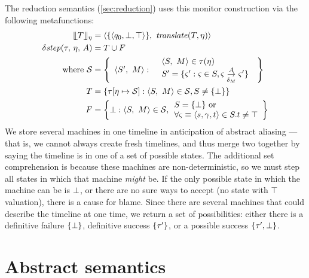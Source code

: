 The reduction semantics (\autoref{sec:reduction}) uses this monitor construction via the following metafunctions:
\begin{align*}
  \compile{\mtcon}{\mtimeline} &= \npmsm{\setof{\pmsmstate{\pmsmq_0, \bot, \top}}}{\translateeps(\mtcon, \mtimeline)} \\
  \sstep{\mTMons}{\mtimeline}{\mevent} &= T \cup F \\
    \text{where } {\mathcal S} &= \left\{
\ensuremath{
      \begin{array}{ll}
        \npmsm{S'}{\pmsmMachine} : &
        \begin{array}{l}
\npmsm{S}{\pmsmMachine} \in     \mTMons(\mtimeline) \\
 S' = \setbuild{\mstate'}{\mstate \in S, \mstate \pmsmstepd{\mevent}{\delta_\pmsmMachine} \mstate'}
\end{array}
      \end{array}
}\right\}
\\\phantom{\text{where }} T &= \setbuild{\mTMons[\mtimeline \mapsto {\mathcal S}]}{\npmsm{S}{\pmsmMachine} \in {\mathcal S}, S \neq \setof{\stfail}}
\\\phantom{\text{where }} F &= \left\{\stfail : \npmsm{S}{\pmsmMachine} \in {\mathcal S},
  \begin{array}{l}
S = \setof{\stfail} \text{ or } \\
\forall \mstate\equiv\pmsmstate{\pmsmqq, \mbindenv, t}\in S. t \neq \top
\end{array}\right\}
\end{align*}
We store several machines in one timeline in anticipation of abstract aliasing --- that is, we cannot always create fresh timelines, and thus merge two together by saying the timeline is in one of a set of possible states.
%
The additional set comprehension is because these machines are non-deterministic, so we must step all states in which that machine \emph{might} be.
%
If the only possible state in which the machine can be is $\bot$, or there are no sure ways to accept (no state with $\top$ valuation), there is a cause for blame.
%
Since there are several machines that could describe the timeline at one time, we return a set of possibilities: either there is a definitive failure $\{\bot\}$, definitive success $\{\tau'\}$, or a possible success $\{\tau', \bot\}$.

\section{Abstract semantics}

